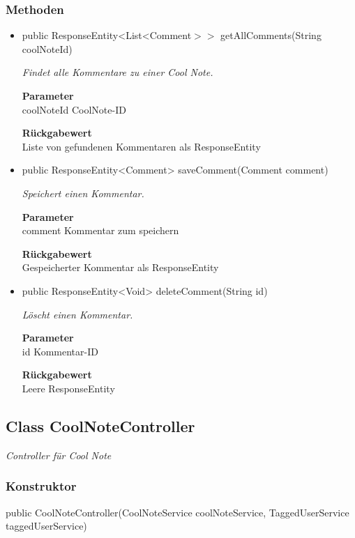 \documentclass[a4paper]{scrreprt}
\begin{document}
        \subsubsection{Methoden}
        \begin{itemize}
        	\item{public ResponseEntity<List<Comment$>>$ getAllComments(String coolNoteId)}
        	
        	\textit{Findet alle Kommentare zu einer Cool Note.}
        	
        	\textbf{Parameter} \\
        	coolNoteId CoolNote-ID
        	
        	\textbf{Rückgabewert} \\
        	Liste von gefundenen Kommentaren als ResponseEntity        \item{public ResponseEntity<Comment> saveComment(Comment comment)}
        	
        	\textit{Speichert einen Kommentar.}
        	
        	\textbf{Parameter} \\
        	comment Kommentar zum speichern
        	
        	\textbf{Rückgabewert} \\
        	Gespeicherter Kommentar als ResponseEntity        \item{public ResponseEntity<Void> deleteComment(String id)}
        	
        	\textit{Löscht einen Kommentar.}
        	
        	\textbf{Parameter} \\
        	id Kommentar-ID
        	
        	\textbf{Rückgabewert} \\
        	Leere ResponseEntity
        \end{itemize}
        \subsection{Class CoolNoteController}
        \textit{Controller für Cool Note}
        \subsubsection{Konstruktor}
        public CoolNoteController(CoolNoteService coolNoteService, TaggedUserService taggedUserService)
\end{document}
